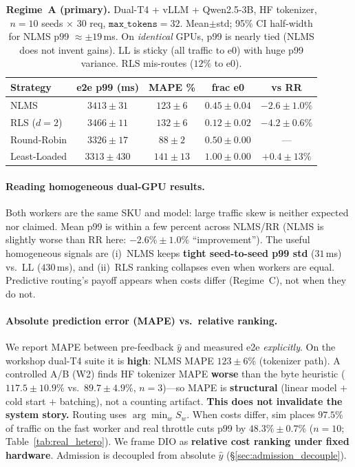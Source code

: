 \documentclass[10pt,twocolumn,letterpaper]{article}
\begin{document}
\begin{table}[t]
\centering
\scriptsize
\setlength{\tabcolsep}{2.8pt}
\begin{tabular}{@{}lcccc@{}}
\toprule
\textbf{Strategy} & \textbf{e2e p99 (ms)} & \textbf{MAPE \%} & \textbf{frac e0} & \textbf{vs RR} \\
\midrule
NLMS & $3413 \pm 31$ & $123 \pm 6$ & $0.45 \pm 0.04$ & $-2.6 \pm 1.0\%$ \\
RLS ($d{=}2$) & $3466 \pm 11$ & $132 \pm 6$ & $0.12 \pm 0.02$ & $-4.2 \pm 0.6\%$ \\
Round-Robin & $3326 \pm 17$ & $88 \pm 2$ & $0.50 \pm 0.00$ & --- \\
Least-Loaded & $3313 \pm 430$ & $141 \pm 13$ & $1.00 \pm 0.00$ & $+0.4 \pm 13\%$ \\
\bottomrule
\end{tabular}
\caption{\textbf{Regime~A (primary).} Dual-T4 + vLLM + Qwen2.5-3B, HF tokenizer, $n{=}10$ seeds $\times$ 30 req, $\texttt{max\_tokens}{=}32$. Mean$\pm$std; 95\% CI half-width for NLMS p99 $\approx\pm19$\,ms. On \emph{identical} GPUs, p99 is nearly tied (NLMS does not invent gains). LL is sticky (all traffic to e0) with huge p99 variance. RLS mis-routes ($12\%$ to e0).}
\label{tab:e2e_dual_t4}
\end{table}

\paragraph{Reading homogeneous dual-GPU results.}
Both workers are the same SKU and model: large traffic skew is neither expected nor claimed. Mean p99 is within a few percent across NLMS/RR (NLMS is slightly worse than RR here: $-2.6\%\pm1.0\%$ ``improvement''). The useful homogeneous signals are (i)~NLMS keeps \textbf{tight seed-to-seed p99 std} ($31$\,ms) vs.\ LL ($430$\,ms), and (ii)~RLS ranking collapses even when workers are equal. Predictive routing's payoff appears when costs differ (Regime~C), not when they do not.

\paragraph{Absolute prediction error (MAPE) vs.\ relative ranking.}
\label{sec:mape}
We report MAPE between pre-feedback $\hat{y}$ and measured e2e \emph{explicitly}. On the workshop dual-T4 suite it is \textbf{high}: NLMS MAPE $123\pm6\%$ (tokenizer path). A controlled A/B (W2) finds HF tokenizer MAPE \textbf{worse} than the byte heuristic ($117.5\pm10.9\%$ vs.\ $89.7\pm4.9\%$, $n{=}3$)---so MAPE is \textbf{structural} (linear model $+$ cold start $+$ batching), not a counting artifact. \textbf{This does not invalidate the system story.} Routing uses $\arg\min_w S_w$. When costs differ, sim places $97.5\%$ of traffic on the fast worker and real throttle cuts p99 by $48.3\%\pm0.7\%$ ($n{=}10$; Table~\ref{tab:real_hetero}). We frame DIO as \textbf{relative cost ranking under fixed hardware}. Admission is decoupled from absolute $\hat{y}$ (\S\ref{sec:admission_decouple}).
\end{document}
